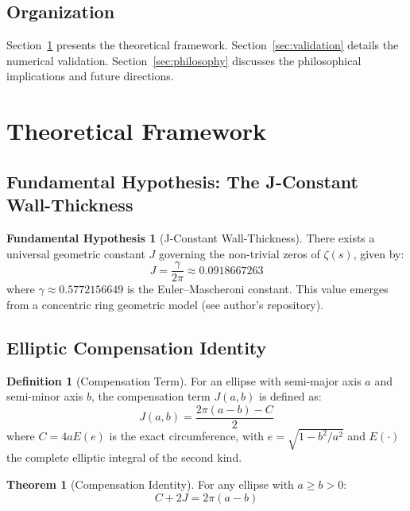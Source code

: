\documentclass[11pt,a4paper]{article}
\theoremstyle{definition}
\newtheorem{theorem}{Theorem}[section]
\newtheorem{definition}{Definition}[section]
\newtheorem{hypothesis}{Fundamental Hypothesis}[section]
\begin{document}
\subsection{Organization}
Section~\ref{sec:framework} presents the theoretical framework. 
Section~\ref{sec:validation} details the numerical validation. 
Section~\ref{sec:philosophy} discusses the philosophical implications and future directions.

\section{Theoretical Framework}\label{sec:framework}

\subsection{Fundamental Hypothesis: The J-Constant Wall-Thickness}

\begin{hypothesis}[J-Constant Wall-Thickness]\label{hyp:J}
There exists a universal geometric constant \(J\) governing the non-trivial zeros of \(\zeta(s)\), given by:
\begin{equation}
J = \frac{\gamma}{2\pi} \approx 0.0918667263
\end{equation}
where \(\gamma \approx 0.5772156649\) is the Euler--Mascheroni constant. 
This value emerges from a concentric ring geometric model (see author's repository).
\end{hypothesis}

\subsection{Elliptic Compensation Identity}

\begin{definition}[Compensation Term]
For an ellipse with semi-major axis \(a\) and semi-minor axis \(b\), the compensation term \(J(a,b)\) is defined as:
\begin{equation}
J(a,b) = \frac{2\pi(a-b) - C}{2}
\end{equation}
where \(C = 4a E(e)\) is the exact circumference, with \(e = \sqrt{1 - b^2/a^2}\) and \(E(\cdot)\) the complete elliptic integral of the second kind.
\end{definition}

\begin{theorem}[Compensation Identity]\label{thm:compensation}
For any ellipse with \(a \geq b > 0\):
\begin{equation}
C + 2J = 2\pi(a-b)
\end{equation}
\end{theorem}
\end{document}
